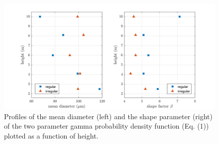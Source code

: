 \documentclass[draft,linenumbers]{agujournal}
\begin{document}
\begin{figure}[t]
 \centering
 	\includegraphics[width=14cm]{MeanShape.png}
 \caption{Profiles of the mean diameter (left) and the shape parameter (right) of the two parameter gamma probability density function (Eq. (1)) plotted as a function of height.}
 \label{fig:shapeFactor}
\end{figure}








%
%
%
%
%
%
%
%
\end{document}

